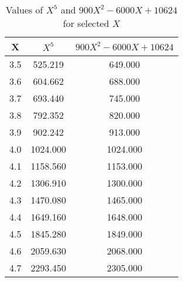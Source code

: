 ﻿%
\begin{table}[h!]
    \centering
    \caption{Values of $X^5$ and $900X^2 - 6000X + 10624$ for selected $X$}
    \begin{tabular}{|c|c|c|}
        \hline
        \textbf{X} & \textbf{$X^5$} & \textbf{$900X^2 - 6000X + 10624$} \\ \hline
        3.5        & 525.219        & 649.000                           \\ \hline
        3.6        & 604.662        & 688.000                           \\ \hline
        3.7        & 693.440        & 745.000                           \\ \hline
        3.8        & 792.352        & 820.000                           \\ \hline
        3.9        & 902.242        & 913.000                           \\ \hline
        4.0        & 1024.000       & 1024.000                          \\ \hline
        4.1        & 1158.560       & 1153.000                          \\ \hline
        4.2        & 1306.910       & 1300.000                          \\ \hline
        4.3        & 1470.080       & 1465.000                          \\ \hline
        4.4        & 1649.160       & 1648.000                          \\ \hline
        4.5        & 1845.280       & 1849.000                          \\ \hline
        4.6        & 2059.630       & 2068.000                          \\ \hline
        4.7        & 2293.450       & 2305.000                          \\ \hline

\end{tabular}
\end{table}
